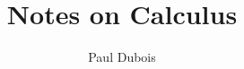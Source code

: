 \documentclass[]{article}
\title{Notes on Calculus}
\author{Paul Dubois}
\date{}
\begin{document}
	
	\maketitle
	
	\begin{abstract}
		
	\end{abstract}
	
	
\end{document}
